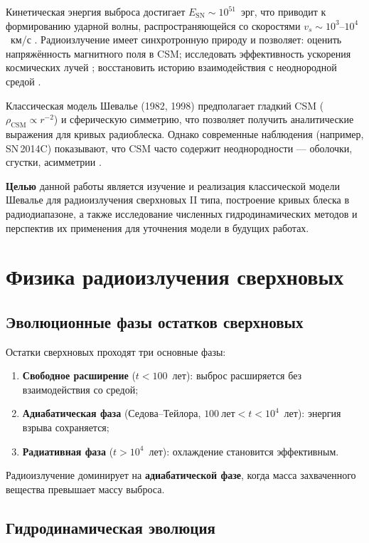 \documentclass[a4paper,12pt]{extarticle}
\newcommand{\vs}{v_s}
\newcommand{\csm}{\text{CSM}}
\newcommand{\esn}{E_{\text{SN}}}
\begin{document}
Кинетическая энергия выброса достигает $\esn \sim 10^{51}$~эрг, что приводит к формированию ударной волны, распространяющейся со скоростями $\vs \sim 10^3$–$10^4$~км/с \cite{draine2011}. Радиоизлучение имеет синхротронную природу и позволяет: оценить напряжённость магнитного поля в CSM; исследовать эффективность ускорения космических лучей \cite{blandford1978}; восстановить историю взаимодействия с неоднородной средой \cite{reynolds2008}.

Классическая модель Шевалье (1982, 1998) предполагает гладкий CSM ($\rho_{\csm} \propto r^{-2}$) и сферическую симметрию, что позволяет получить аналитические выражения для кривых радиоблеска. Однако современные наблюдения (например, SN\,2014C) показывают, что CSM часто содержит неоднородности — оболочки, сгустки, асимметрии \cite{cendes2019}.

\textbf{Целью} данной работы является изучение и реализация классической модели Шевалье для радиоизлучения сверхновых II типа, построение кривых блеска в радиодиапазоне, а также исследование численных гидродинамических методов и перспектив их применения для уточнения модели в будущих работах.

\section{Физика радиоизлучения сверхновых}

\subsection{Эволюционные фазы остатков сверхновых}

Остатки сверхновых проходят три основные фазы:
\begin{enumerate}
    \item \textbf{Свободное расширение} ($t < 100$~лет): выброс расширяется без взаимодействия со средой;
    \item \textbf{Адиабатическая фаза} (Седова–Тейлора, $100~\text{лет} < t < 10^4$~лет): энергия взрыва сохраняется;
    \item \textbf{Радиативная фаза} ($t > 10^4$~лет): охлаждение становится эффективным.
\end{enumerate}

Радиоизлучение доминирует на \textbf{адиабатической фазе}, когда масса захваченного вещества превышает массу выброса.

\subsection{Гидродинамическая эволюция}
\end{document}
